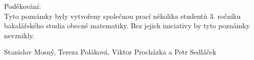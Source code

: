 \newpage
Poděkování:\\

Tyto poznámky byly vytvořeny společnou prací několika studentů 3. ročníku bakalářského studia obecné matematiky. Bez jejich iniciativy by tyto poznámky nevznikly. \\

\begin{flushright}
Stanislav Mosný, Tereza Poláková, Viktor Procházka a Petr Sedláček
\end{flushright}